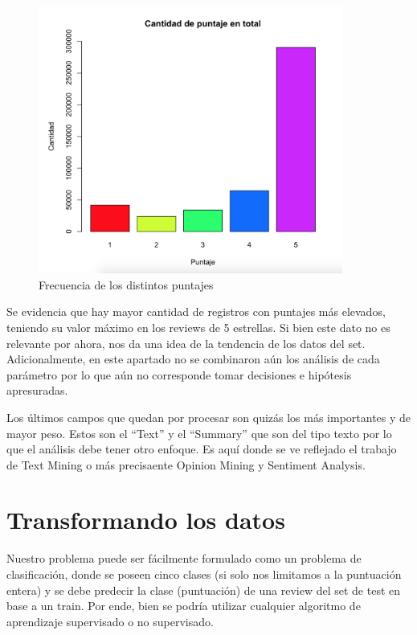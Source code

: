 \documentclass[a4paper,11pt]{report}
\begin{document}
\begin{figure}[htp]
  \begin{center}
    \includegraphics[width=10cm]{puntajcant}
    \caption{Frecuencia de los distintos puntajes}
    \label{fig:2}
  \end{center}
\end{figure}

Se evidencia que hay mayor cantidad de registros con puntajes más elevados, teniendo su valor máximo en los reviews de 5 estrellas. Si bien este dato no es relevante por ahora, nos da una idea de la tendencia de los datos del set. Adicionalmente, en este apartado no se combinaron aún los análisis de cada parámetro por lo que aún no corresponde tomar decisiones e hipótesis apresuradas.

Los últimos campos que quedan por procesar son quizás los más importantes y de mayor peso. Estos son el “Text” y el “Summary” que son del tipo texto por lo que el análisis debe tener otro enfoque. Es aquí donde se ve reflejado el trabajo de Text Mining o más precisaente Opinion Mining y Sentiment Analysis.

\chapter{Transformando los datos}
Nuestro problema puede ser fácilmente formulado como un problema de clasificación, donde se poseen cinco clases (si solo nos limitamos a la puntuación entera) y se debe predecir la clase (puntuación) de una review del set de test en base a un train. Por ende, bien se podría utilizar cualquier algoritmo de aprendizaje supervisado o no supervisado. 
\end{document}
